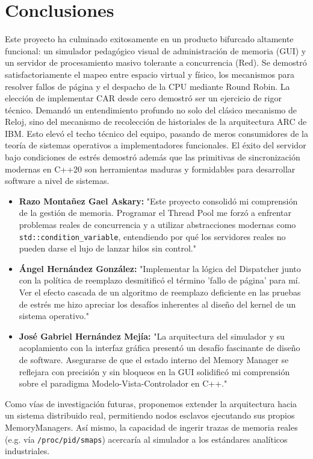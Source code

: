 \documentclass[12pt,letterpaper]{article}
\begin{document}
\section{Conclusiones}

Este proyecto ha culminado exitosamente en un producto bifurcado altamente funcional: un simulador pedagógico visual de administración de memoria (GUI) y un servidor de procesamiento masivo tolerante a concurrencia (Red).
Se demostró satisfactoriamente el mapeo entre espacio virtual y físico, los mecanismos para resolver fallos de página y el despacho de la CPU mediante Round Robin.
La elección de implementar CAR desde cero demostró ser un ejercicio de rigor técnico.
Demandó un entendimiento profundo no solo del clásico mecanismo de Reloj, sino del mecanismo de recolección de historiales de la arquitectura ARC de IBM.
Esto elevó el techo técnico del equipo, pasando de meros consumidores de la teoría de sistemas operativos a implementadores funcionales.
El éxito del servidor bajo condiciones de estrés demostró además que las primitivas de sincronización modernas en C++20 son herramientas maduras y formidables para desarrollar software a nivel de sistemas.
\begin{itemize}
    \item \textbf{Razo Montañez Gael Askary:} "Este proyecto consolidó mi comprensión de la gestión de memoria. Programar el Thread Pool me forzó a enfrentar problemas reales de concurrencia y a utilizar abstracciones modernas como \texttt{std::condition\_variable}, entendiendo por qué los servidores reales no pueden darse el lujo de lanzar hilos sin control."
    \item \textbf{Ángel Hernández González:} "Implementar la lógica del Dispatcher junto con la política de reemplazo desmitificó el término 'fallo de página' para mí. Ver el efecto cascada de un algoritmo de reemplazo deficiente en las pruebas de estrés me hizo apreciar los desafíos inherentes al diseño del kernel de un sistema operativo."
    \item \textbf{José Gabriel Hernández Mejía:} "La arquitectura del simulador y su acoplamiento con la interfaz gráfica presentó un desafío fascinante de diseño de software. Asegurarse de que el estado interno del Memory Manager se reflejara con precisión y sin bloqueos en la GUI solidificó mi comprensión sobre el paradigma Modelo-Vista-Controlador en C++."
\end{itemize}
Como vías de investigación futuras, proponemos extender la arquitectura hacia un sistema distribuido real, permitiendo nodos esclavos ejecutando sus propios MemoryManagers.
Así mismo, la capacidad de ingerir trazas de memoria reales (e.g. vía \texttt{/proc/pid/smaps}) acercaría al simulador a los estándares analíticos industriales.
\newpage
\end{document}
